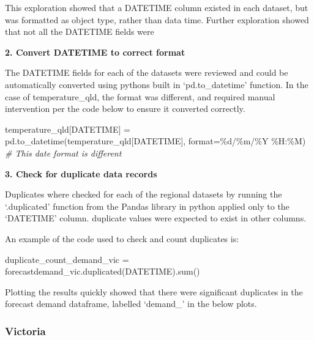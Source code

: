 \documentclass[
]{article}
\newenvironment{Shaded}{}{}
\newcommand{\BuiltInTok}[1]{\textcolor[rgb]{0.00,0.50,0.00}{#1}}
\newcommand{\CommentTok}[1]{\textcolor[rgb]{0.38,0.63,0.69}{\textit{#1}}}
\newcommand{\NormalTok}[1]{#1}
\newcommand{\OperatorTok}[1]{\textcolor[rgb]{0.40,0.40,0.40}{#1}}
\newcommand{\SpecialCharTok}[1]{\textcolor[rgb]{0.25,0.44,0.63}{#1}}
\newcommand{\StringTok}[1]{\textcolor[rgb]{0.25,0.44,0.63}{#1}}
\begin{document}
This exploration showed that a DATETIME column existed in each dataset,
but was formatted as object type, rather than data time. Further
exploration showed that not all the DATETIME fields were

\textbf{2. Convert DATETIME to correct format}

The DATETIME fields for each of the datasets were reviewed and could be
automatically converted using pythons built in `pd.to\_datetime'
function. In the case of temperature\_qld, the format was different, and
required manual intervention per the code below to ensure it converted
correctly.

\begin{Shaded}
\begin{Highlighting}[]
\NormalTok{temperature\_qld[}\StringTok{\textquotesingle{}DATETIME\textquotesingle{}}\NormalTok{] }\OperatorTok{=}\NormalTok{ pd.to\_datetime(temperature\_qld[}\StringTok{\textquotesingle{}DATETIME\textquotesingle{}}\NormalTok{], }\BuiltInTok{format}\OperatorTok{=}\StringTok{\textquotesingle{}}\SpecialCharTok{\%d}\StringTok{/\%m/\%Y \%H:\%M\textquotesingle{}}\NormalTok{) }\CommentTok{\# This date format is different}
\end{Highlighting}
\end{Shaded}

\textbf{3. Check for duplicate data records}

Duplicates where checked for each of the regional datasets by running
the `.duplicated' function from the Pandas library in python applied
only to the `DATETIME' column. duplicate values were expected to exist
in other columns.

An example of the code used to check and count duplicates is:

\begin{Shaded}
\begin{Highlighting}[]
\NormalTok{duplicate\_count\_demand\_vic }\OperatorTok{=}\NormalTok{ forecastdemand\_vic.duplicated(}\StringTok{\textquotesingle{}DATETIME\textquotesingle{}}\NormalTok{).}\BuiltInTok{sum}\NormalTok{()}
\end{Highlighting}
\end{Shaded}

Plotting the results quickly showed that there were significant
duplicates in the forecast demand dataframe, labelled `demand\_' in the
below plots.

\subsubsection{Victoria}\label{victoria}
\end{document}
